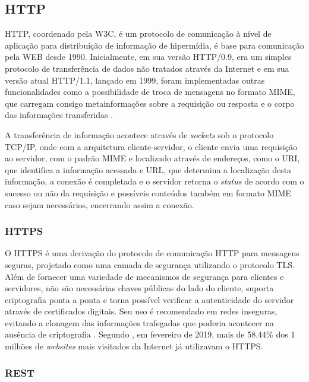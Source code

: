     \subsection{HTTP}
    \label{sec:http}
    \gls{HTTP}, coordenado pela \gls{W3C}, é um protocolo de comunicação à nível de aplicação para distribuição de informação de hipermídia, é base para comunicação pela \gls{WEB} desde 1990. Inicialmente, em sua versão HTTP/0.9, era um simples protocolo de transferência de dados não tratados através da Internet e em sua versão atual HTTP/1.1, lançado em 1999, foram implementadas outras funcionalidades como a possibilidade de troca de mensagens no formato \gls{MIME}, que carregam consigo metainformações sobre a requisição ou resposta e o corpo das informações transferidas \cite{HTTP}.
    
    A transferência de informação acontece através de \textit{sockets} sob o protocolo \gls{TCP/IP}, onde com a arquitetura cliente-servidor, o cliente envia uma requisição ao servidor, com o padrão \gls{MIME} e  localizado através de endereços, como o \gls{URI}, que identifica a informação acessada e \gls{URL}, que determina a localização desta informação, a conexão é completada e o servidor retorna o \textit{status} de acordo com o sucesso ou não da requisição e possíveis conteúdos também em formato \gls{MIME} caso sejam necessários, encerrando assim a conexão.
    
        \subsubsection{HTTPS}
        \label{sec:https}
        O \gls{HTTPS} é uma derivação do protocolo de comunicação \gls{HTTP} para mensagens seguras, projetado como uma camada de segurança utilizando o protocolo \gls{TLS}. Além de fornecer uma variedade de mecanismos de segurança para clientes e servidores, não são necessárias chaves públicas do lado do cliente, suporta criptografia ponta a ponta e torna possível verificar a autenticidade do servidor através de certificados digitais. Seu uso é recomendado em redes inseguras, evitando a clonagem das informações trafegadas que poderia acontecer na ausência de criptografia \cite{HTTPS}. Segundo , em fevereiro de 2019, mais de 58.44\% dos 1 milhões de \textit{websites} mais visitados da Internet já utilizavam o \gls{HTTPS}.
        
        \subsubsection{REST}
        \label{sec:rest}

